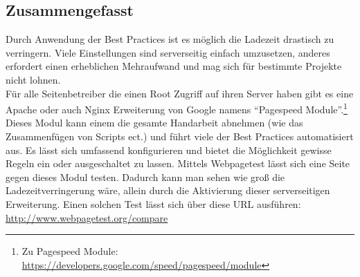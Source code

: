 	\subsection{Zusammengefasst} %
	\label{sub:zusammengefasst_entwicklung}
		Durch Anwendung der Best Practices ist es möglich die Ladezeit drastisch zu verringern. Viele Einstellungen sind serverseitig einfach umzusetzen, anderes erfordert einen erheblichen Mehraufwand und mag sich für bestimmte Projekte nicht lohnen.\\
		Für alle Seitenbetreiber die einen Root Zugriff auf ihren Server haben gibt es eine Apache oder auch Nginx Erweiterung von Google namens "`Pagespeed Module"'.\footnote{Zu Pagespeed Module: \url{https://developers.google.com/speed/pagespeed/module}} Dieses Modul kann einem die gesamte Handarbeit abnehmen (wie das Zusammenfügen von Scripts ect.) und führt viele der Best Practices automatisiert aus. Es lässt sich umfassend konfigurieren und bietet die Möglichkeit gewisse Regeln ein oder ausgeschaltet zu lassen. Mittels Webpagetest lässt sich eine Seite gegen dieses Modul testen. Dadurch kann man sehen wie groß die Ladezeitverringerung wäre, allein durch die Aktivierung dieser serverseitigen Erweiterung. Einen solchen Test lässt sich über diese URL ausführen: \url{http://www.webpagetest.org/compare} 


\pagebreak
%
%
